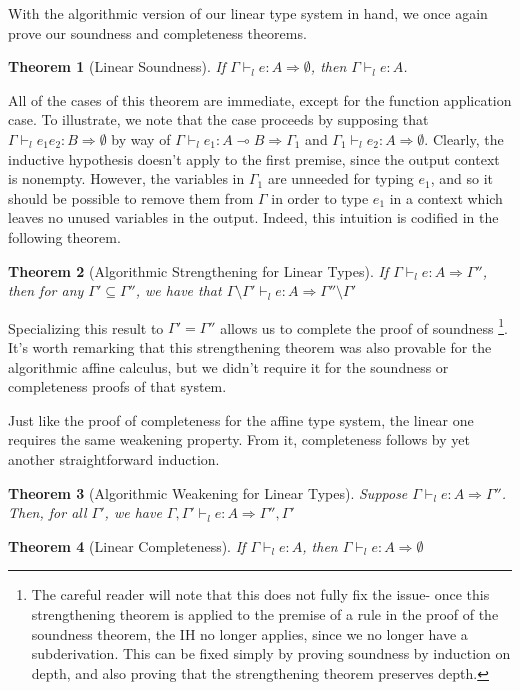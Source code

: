 \documentclass{article}
\newtheorem{theorem}{Theorem}
\theoremstyle{definition}
\newcommand{\loli}{\multimap}
\newcommand{\gens}{\Rightarrow}
\begin{document}
With the algorithmic version of our linear type system in hand, we once again prove our soundness and completeness theorems.

\begin{theorem}[Linear Soundness]
If $\Gamma \vdash_l e : A \gens \emptyset$, then $\Gamma \vdash_l e : A$.
\end{theorem}

All of the cases of this theorem are immediate, except for the function application case. To illustrate, we note that the case proceeds by supposing that $\Gamma \vdash_l e_1 e_2 : B \gens \emptyset$ by way of $\Gamma \vdash_l e_1 : A \loli B \gens \Gamma_1$ and $\Gamma_1 \vdash_l e_2 : A \gens \emptyset$. Clearly, the inductive hypothesis doesn't apply to the first premise, since the output context is nonempty. However, the variables in $\Gamma_1$ are unneeded for typing $e_1$, and so it should be possible to remove them from $\Gamma$ in order to type $e_1$ in a context which leaves no unused variables in the output. Indeed, this intuition is codified in the following theorem.

\begin{theorem}[Algorithmic Strengthening for Linear Types]
If $\Gamma \vdash_l e : A \gens \Gamma''$, then for any $\Gamma' \subseteq \Gamma''$, we have that $\Gamma \setminus \Gamma' \vdash_l e : A \gens \Gamma'' \setminus \Gamma'$
\end{theorem}

Specializing this result to $\Gamma' = \Gamma''$ allows us to complete the proof of soundness
\footnote{The careful reader will note that this does not fully fix the issue- once this strengthening theorem is applied to the premise of a rule in the proof of the soundness theorem, the IH no longer applies, since we no longer have a subderivation. This can be fixed simply by proving soundness by induction on depth, and also proving that the strengthening theorem preserves depth.}.
It's worth remarking that this strengthening theorem was also provable for the algorithmic affine calculus, but we didn't require it for the soundness or completeness proofs of that system.

Just like the proof of completeness for the affine type system, the linear one requires the same weakening property. From it, completeness follows by yet another straightforward induction.


\begin{theorem}[Algorithmic Weakening for Linear Types]
Suppose $\Gamma \vdash_l e : A \gens \Gamma''$. Then, for all $\Gamma'$, we have $\Gamma,\Gamma' \vdash_l e : A \gens \Gamma'', \Gamma'$
\end{theorem}

\begin{theorem}[Linear Completeness]
If $\Gamma \vdash_l e : A$, then $\Gamma \vdash_l e : A \gens \emptyset$
\end{theorem}
\end{document}
